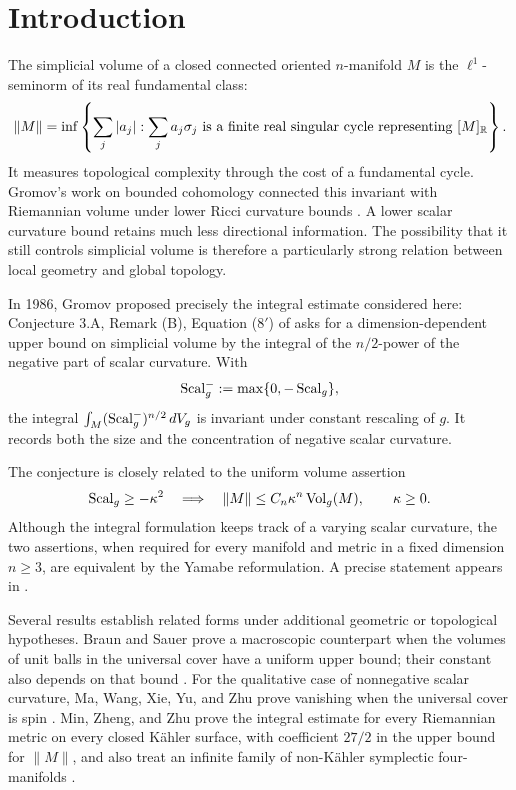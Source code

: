 \section{Introduction}
\label{sec:introduction}

The simplicial volume of a closed connected oriented \(n\)-manifold
\(M\) is the \(\ell^1\)-seminorm of its real fundamental class:
\[
\|M\|=
\inf\left\{\sum_j|a_j|:
 \sum_j a_j\sigma_j\text{ is a finite real singular cycle representing }
 [M]_{\mathbb R}\right\}.
\]
It measures topological complexity through the cost of a fundamental
cycle. Gromov's work on bounded cohomology connected this invariant
with Riemannian volume under lower Ricci curvature bounds
\cite{Gromov1982}. A lower scalar curvature bound retains much less
directional information. The possibility that it still controls
simplicial volume is therefore a particularly strong relation between
local geometry and global topology.

In 1986, Gromov proposed precisely the integral estimate considered
here: Conjecture 3.A, Remark (B), Equation (8\('\)) of
\cite{Gromov1986} asks for a dimension-dependent upper bound on
simplicial volume by the integral of the \(n/2\)-power of the negative
part of scalar curvature. With
\[
  \operatorname{Scal}_g^-:=\max\{0,-\operatorname{Scal}_g\},
\]
the integral
\(\int_M(\operatorname{Scal}_g^-)^{n/2}\,dV_g\) is invariant under constant rescaling
of \(g\). It records both the size and the concentration of negative
scalar curvature.

The conjecture is closely related to the uniform volume assertion
\[
\operatorname{Scal}_g\ge-\kappa^2
\quad\Longrightarrow\quad
\|M\|\le C_n\kappa^n\operatorname{Vol}_g(M),
\qquad \kappa\ge0.
\]
Although the integral formulation keeps track of a varying scalar
curvature, the two assertions, when required for every manifold and
metric in a fixed dimension \(n\ge3\), are equivalent by the Yamabe
reformulation. A precise statement appears in
\cite[Lemma 2.1]{MinZhengZhu2026}.

Several results establish related forms under additional geometric or
topological hypotheses. Braun and Sauer prove a macroscopic counterpart
when the volumes of unit balls in the universal cover have a uniform
upper bound; their constant also depends on that bound
\cite[Theorem 1.1]{BraunSauer2021}. For the qualitative case of
nonnegative scalar curvature, Ma, Wang, Xie, Yu, and Zhu prove
vanishing when the universal cover is spin
\cite{MaWangXieYuZhu2026}. Min, Zheng, and Zhu prove the integral
estimate for every Riemannian metric on every closed K\"ahler surface,
with coefficient \(27/2\) in the upper bound for \(\|M\|\), and also
treat an infinite family of non-K\"ahler symplectic four-manifolds
\cite[Theorem 1.2 and Section 4]{MinZhengZhu2026}.

